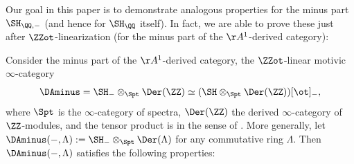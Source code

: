 Our goal in this paper is to demonstrate analogous properties for the minus part $\SH_{\QQ,-}$ (and hence for $\SH_\QQ$ itself).
In fact, we are able to prove these just after $\ZZot$-linearization (\ie for the minus part of the $\AA^1$-derived category):

\begin{thmi}\label{thm:intro_SHminus}
Consider the minus part of the $\AA^1$-derived category, \ie the $\ZZot$-linear motivic $\infty$-category\vspace*{-3pt}
\[
\DAminus
= \SH_- \otimes_{\Spt} {\Der(\ZZ)}
\simeq (\SH \otimes_{\Spt} \Der(\ZZ))[\ot]_-,
\]
where $\Spt$ is the $\infty$-category of spectra, $\Der(\ZZ)$ the derived $\infty$-category of $\ZZ$-modules, and the tensor product is in the sense of \cite[\S 4.8]{LurieHA}.
More generally, let $\DAminus(-, \Lambda) := \SH_- \otimes_{\Spt} \Der(\Lambda)$ for any commutative ring $\Lambda$.
Then $\DAminus(-, \Lambda)$ satisfies the following properties:


\end{thmi}
